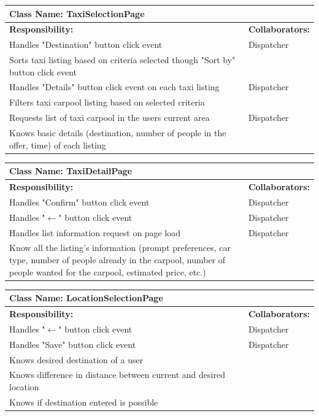 \documentclass[]{article}
\begin{document}
	\begin{table}[H]
	\centering
	\begin{tabular}{|p{6cm}|p{6cm}|}
	\hline 
		\multicolumn{2}{|l|}{\textbf{Class Name: TaxiSelectionPage}} \\
	\hline
	\textbf{Responsibility:} & \textbf{Collaborators:} \\
	\hline
	Handles "Destination" button click event& Dispatcher \\ \hline
	Sorts taxi listing based on criteria selected though "Sort by" button click event  & \\ \hline
	Handles "Details" button click event  on each taxi listing & Dispatcher \\ \hline
	Filters taxi carpool listing based on selected criteria & \\ \hline
	Requests list of taxi carpool in the users current area & Dispatcher \\ \hline
	Knows basic details (destination, number of people in the offer, time) of each listing & \\ \hline
	\end{tabular}
	\end{table}
	

	\begin{table}[H]
	\centering
	\begin{tabular}{|p{6cm}|p{6cm}|}
	\hline 
		\multicolumn{2}{|l|}{\textbf{Class Name: TaxiDetailPage}} \\
	\hline
	\textbf{Responsibility:} & \textbf{Collaborators:} \\
	\hline
	Handles "Confirm" button click event  & Dispatcher \\ \hline
	Handles "$\xleftarrow{}$" button click event  & Dispatcher \\ \hline
	Handles list information request on page load & Dispatcher\\ \hline
	Know all the listing's information (prompt preferences, car type, number of people already in the carpool, number of people wanted for the carpool, estimated price, etc.)  & \\ \hline
	\end{tabular}
	\end{table}
	
	\begin{table}[H]
	\centering
	\begin{tabular}{|p{6cm}|p{6cm}|}
	\hline 
		\multicolumn{2}{|l|}{\textbf{Class Name: LocationSelectionPage}} \\
	\hline
	\textbf{Responsibility:} & \textbf{Collaborators:} \\
	\hline
	Handles "$\xleftarrow{}$" button click event  & Dispatcher \\ \hline
	Handles "Save" button click event  & Dispatcher\\ \hline
	Knows desired destination of a user & \\ \hline
	Knows difference in distance between current and desired location & \\ \hline
	Knows if destination entered is possible & \\ \hline
	\end{tabular}
	\end{table}
	
\end{document}
